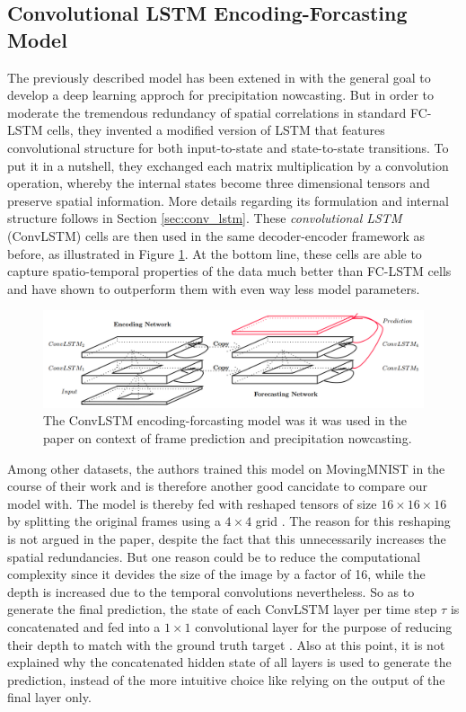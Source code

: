 \subsection{Convolutional LSTM Encoding-Forcasting Model}

The previously described model has been extened in \parencite{conv_lstm_nowcasting} with the general goal to develop a deep learning approch for precipitation nowcasting. But in order to moderate the tremendous redundancy of spatial correlations in standard FC-LSTM cells, they invented a modified version of LSTM that features convolutional structure for both input-to-state and state-to-state transitions. To put it in a nutshell, they exchanged each matrix multiplication by a convolution operation, whereby the internal states become three dimensional tensors and preserve spatial information. More details regarding its formulation and internal structure follows in Section \ref{sec:conv_lstm}. These \textit{convolutional LSTM} (ConvLSTM) cells are then used in the same decoder-encoder framework as before, as illustrated in Figure \ref{fig:convlstm_model}. At the bottom line, these cells are able to capture spatio-temporal properties of the data much better than FC-LSTM cells and have shown to outperform them with even way less model parameters.

\begin{figure}[htb]
	\centering
	\includegraphics[width=0.8\linewidth]{figures/related/nowcasting_model.png} 
	\caption[ConvLSTM Encoding-Forcasting Model]{The ConvLSTM encoding-forcasting model was it was used in the paper on context of frame prediction and precipitation nowcasting.} \label{fig:convlstm_model}
\end{figure}

Among other datasets, the authors trained this model on MovingMNIST in the course of their work and is therefore another good cancidate to compare our model with. The model is thereby fed with reshaped tensors of size $16 \times 16 \times 16$ by splitting the original frames using a $4 \times 4$ grid \parencite[p. 6]{conv_lstm_nowcasting}. The reason for this reshaping is not argued in the paper, despite the fact that this unnecessarily increases the spatial redundancies. But one reason could be to reduce the computational complexity since it devides the size of the image by a factor of 16, while the depth is increased due to the temporal convolutions nevertheless. So as to generate the final prediction, the state of each ConvLSTM layer per time step $\tau$ is concatenated and fed into a $1 \times 1$ convolutional layer for the purpose of reducing their depth to match with the ground truth target \parencite[p. 4]{conv_lstm_nowcasting}. Also at this point, it is not explained why the concatenated hidden state of all layers is used to generate the prediction, instead of the more intuitive choice like relying on the output of the final layer only.

